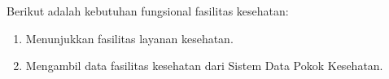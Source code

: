 Berikut adalah kebutuhan fungsional fasilitas kesehatan:
\begin{enumerate}
	\item Menunjukkan fasilitas layanan kesehatan.
	\item Mengambil data fasilitas kesehatan dari Sistem Data Pokok Kesehatan.
\end{enumerate}